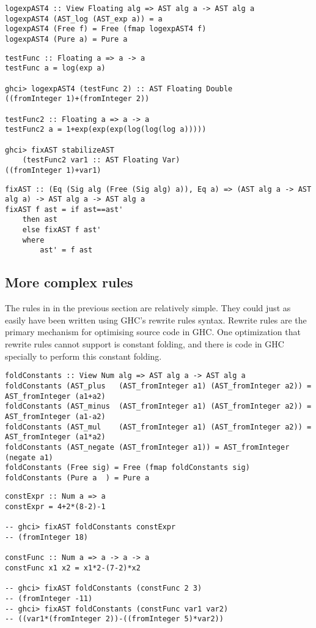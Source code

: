 \documentclass[preprint]{sigplanconf}
\theoremstyle{definition}
\begin{document}
\begin{lstlisting}
logexpAST4 :: View Floating alg => AST alg a -> AST alg a
logexpAST4 (AST_log (AST_exp a)) = a
logexpAST4 (Free f) = Free (fmap logexpAST4 f)
logexpAST4 (Pure a) = Pure a
\end{lstlisting}

\begin{lstlisting}
testFunc :: Floating a => a -> a
testFunc a = log(exp a)

ghci> logexpAST4 (testFunc 2) :: AST Floating Double
((fromInteger 1)+(fromInteger 2))

testFunc2 :: Floating a => a -> a
testFunc2 a = 1+exp(exp(exp(log(log(log a)))))

ghci> fixAST stabilizeAST
    (testFunc2 var1 :: AST Floating Var)
((fromInteger 1)+var1)
\end{lstlisting}

\begin{lstlisting}
fixAST :: (Eq (Sig alg (Free (Sig alg) a)), Eq a) => (AST alg a -> AST alg a) -> AST alg a -> AST alg a
fixAST f ast = if ast==ast'
    then ast
    else fixAST f ast'
    where
        ast' = f ast
\end{lstlisting}

\subsection{More complex rules}

The rules in in the previous section are relatively simple.
They could just as easily have been written using GHC's rewrite rules syntax.
Rewrite rules are the primary mechanism for optimising source code in GHC.
One optimization that rewrite rules cannot support is constant folding,
and there is code in GHC specially to perform this constant folding.

\begin{lstlisting}
foldConstants :: View Num alg => AST alg a -> AST alg a
foldConstants (AST_plus   (AST_fromInteger a1) (AST_fromInteger a2)) = AST_fromInteger (a1+a2)
foldConstants (AST_minus  (AST_fromInteger a1) (AST_fromInteger a2)) = AST_fromInteger (a1-a2)
foldConstants (AST_mul    (AST_fromInteger a1) (AST_fromInteger a2)) = AST_fromInteger (a1*a2)
foldConstants (AST_negate (AST_fromInteger a1)) = AST_fromInteger (negate a1)
foldConstants (Free sig) = Free (fmap foldConstants sig)
foldConstants (Pure a  ) = Pure a
\end{lstlisting}

\begin{lstlisting}
constExpr :: Num a => a
constExpr = 4+2*(8-2)-1

-- ghci> fixAST foldConstants constExpr
-- (fromInteger 18)

constFunc :: Num a => a -> a -> a
constFunc x1 x2 = x1*2-(7-2)*x2

-- ghci> fixAST foldConstants (constFunc 2 3)
-- (fromInteger -11)
-- ghci> fixAST foldConstants (constFunc var1 var2)
-- ((var1*(fromInteger 2))-((fromInteger 5)*var2))
\end{lstlisting}
\end{document}
